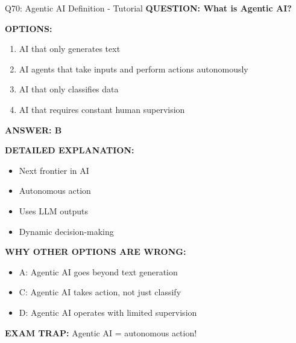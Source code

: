 \documentclass[8pt]{beamer}
\begin{document}
	\begin{frame}{Q70: Agentic AI Definition - Tutorial}
		\fontsize{6.5}{7.5}\selectfont
		\textbf{QUESTION: What is Agentic AI?}
		
		\vspace{0.1cm}
		\textbf{OPTIONS:}
		\begin{enumerate}
			\item AI that only generates text
			\item AI agents that take inputs and perform actions autonomously
			\item AI that only classifies data
			\item AI that requires constant human supervision
		\end{enumerate}
		
		\vspace{0.1cm}
		\textcolor{myblue}{\textbf{ANSWER: B}}
		
		\vspace{0.1cm}
		\textbf{DETAILED EXPLANATION:}
		\begin{itemize}
			\item Next frontier in AI
			\item Autonomous action
			\item Uses LLM outputs
			\item Dynamic decision-making
		\end{itemize}
		
		\vspace{0.1cm}
		\textcolor{myred}{\textbf{WHY OTHER OPTIONS ARE WRONG:}}
		\begin{itemize}
			\item \textcolor{myred}{A:} Agentic AI goes beyond text generation
			\item \textcolor{myred}{C:} Agentic AI takes action, not just classify
			\item \textcolor{myred}{D:} Agentic AI operates with limited supervision
		\end{itemize}
		
		\textcolor{myred}{\textbf{EXAM TRAP:}} Agentic AI = \textcolor{myblue}{autonomous action}!
	\end{frame}
	
	
\end{document}
